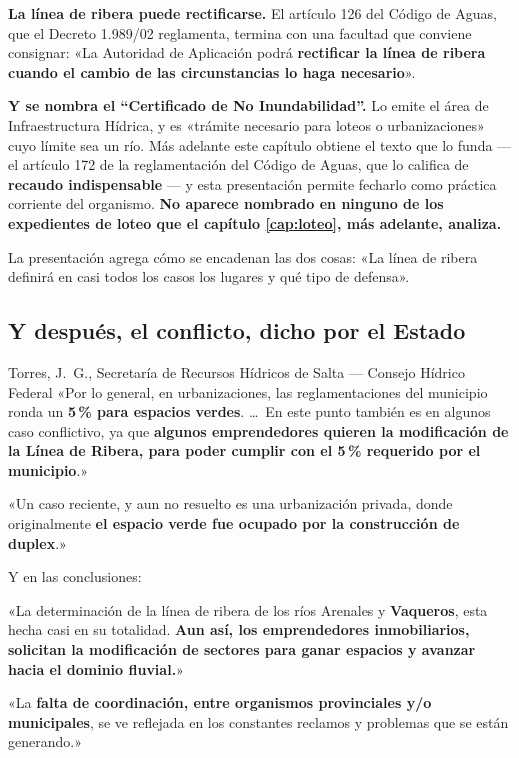 \textbf{La línea de ribera puede rectificarse.} El artículo 126 del Código de Aguas, que el
Decreto 1.989/02 reglamenta, termina con una facultad que conviene consignar: «La
Autoridad de Aplicación podrá \textbf{rectificar la línea de ribera cuando el cambio de las
circunstancias lo haga necesario}».

\textbf{Y se nombra el ``Certificado de No Inundabilidad''.} Lo emite el área de
Infraestructura Hídrica, y es «trámite necesario para loteos o urbanizaciones» cuyo límite sea
un río. Más adelante este capítulo obtiene el texto que lo funda --- el artículo 172 de la
reglamentación del Código de Aguas, que lo califica de \textbf{recaudo indispensable} --- y
esta presentación permite fecharlo como práctica corriente del organismo. \textbf{No aparece
nombrado en ninguno de los expedientes de loteo que el capítulo \ref{cap:loteo}, más adelante, analiza.}

La presentación agrega cómo se encadenan las dos cosas: «La línea de ribera definirá en casi
todos los casos los lugares y qué tipo de defensa».

\subsection*{Y después, el conflicto, dicho por el Estado}

\begin{ficha}{Torres, J.\ G., Secretaría de Recursos Hídricos de Salta --- Consejo Hídrico Federal}
«Por lo general, en urbanizaciones, las reglamentaciones del municipio ronda un \textbf{5\,\%
para espacios verdes}. \ldots\ En este punto también es en algunos caso conflictivo, ya que
\textbf{algunos emprendedores quieren la modificación de la Línea de Ribera, para poder
cumplir con el 5\,\% requerido por el municipio}.»

«Un caso reciente, y aun no resuelto es una urbanización privada, donde originalmente
\textbf{el espacio verde fue ocupado por la construcción de duplex}.»

Y en las conclusiones:

«La determinación de la línea de ribera de los ríos Arenales y \textbf{Vaqueros}, esta hecha
casi en su totalidad. \textbf{Aun así, los emprendedores inmobiliarios, solicitan la
modificación de sectores para ganar espacios y avanzar hacia el dominio fluvial.}»

«La \textbf{falta de coordinación, entre organismos provinciales y/o municipales}, se ve
reflejada en los constantes reclamos y problemas que se están generando.»
\end{ficha}

